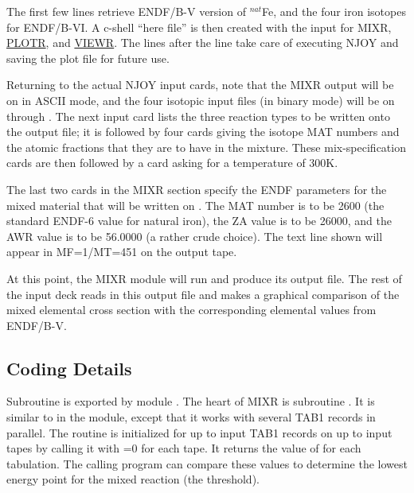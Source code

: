 \noindent
The first few lines retrieve ENDF/B-V version of $^{nat}$Fe, and
the four iron isotopes for ENDF/B-VI.  A c-shell ``here file'' is
then created with the input for MIXR,
\hyperlink{sPLOTRhy}{PLOTR}, and \hyperlink{sVIEWRhy}{VIEWR}.   The
lines after the  line take care of executing NJOY and
saving the plot file for future use.

Returning to the actual NJOY input cards, note that the MIXR output
will be on  in ASCII mode, and the four isotopic input
files (in binary mode) will be on  through .
The next input card lists the three reaction types to be written onto
the output file; it is followed by four cards giving the isotope
MAT numbers and the atomic fractions that they are to have in the
mixture.  These mix-specification cards are then followed by a card
asking for a temperature of 300K.

The last two cards in the MIXR section specify the ENDF parameters
for the mixed material that will be written on .
The MAT number is to be 2600 (the standard ENDF-6 value for natural
iron), the ZA value is to be 26000, and the AWR value is to be
56.0000 (a rather crude choice).  The text line shown will appear
in MF=1/MT=451 on the output tape.

At this point, the MIXR module will run and produce its output
file.  The rest of the input deck reads in this output file and
makes a graphical comparison of the mixed elemental cross section
with the corresponding elemental values from ENDF/B-V.

\subsection{Coding Details}
\label{ssMIXR_details}

Subroutine  is exported by module
.
The heart of MIXR is subroutine .
It is similar to  in the
 module, except
that it works with several TAB1 records in parallel.  The routine
is initialized for up to  input TAB1 records
on up to  input tapes
by calling it with =0 for each tape.  It returns the value of
 for each tabulation.  The calling program can
compare these  values to determine the lowest
energy point for the mixed reaction (the threshold).


